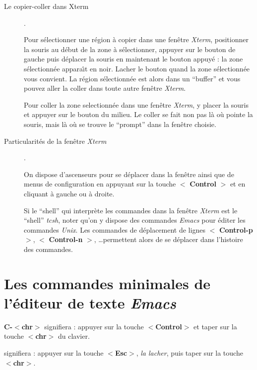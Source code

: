 \begin{description}
\item[Le copier-coller dans Xterm]. 

Pour s\'electionner une r\'egion 
\`a copier dans une fen\^ etre {\em Xterm}, 
 positionner la souris au d\'ebut de la zone \`a s\'electionner,
appuyer sur le bouton de gauche puis d\'eplacer la souris en maintenant le
bouton appuy\'e : la zone s\'electionn\'ee appara\^{\i}t en noir.
Lacher le bouton quand la zone s\'electionn\'ee vous convient. La
r\'egion s\'electionn\'ee est alors dans un ``buffer'' et vous pouvez
aller la coller dans toute autre fen\^etre {\em Xterm}.

\noindent Pour coller la zone selectionn\'ee dans une fen\^etre {\em Xterm}, 
y placer la souris et appuyer sur le bouton du milieu.
Le coller se fait non pas l\`a o\`u pointe la souris, mais l\`a
o\`u se trouve le ``prompt'' dans la fen\^etre choisie.

\item[Particularit\'es de la fen\^etre {\em Xterm}]. 

On dispose d'ascenseurs pour se d\'eplacer dans la fen\^etre ainsi que de 
menus de confi\-guration en appuyant sur la touche $<$ {\bf Control} $>$ et en cliquant \`a gauche ou \`a droite. 

Si le ``shell'' qui  interpr\`ete les commandes dans la fen\^etre {\em Xterm} 
est le ``shell'' {\em tcsh}, noter qu'on y dispose des commandes
 {\em Emacs} pour \'editer les commandes {\em Unix}. 
Les commandes de d\'eplacement de lignes
$<$ {\bf Control-p} $>$, $<$ {\bf Control-n} $>$, \ldots permettent alors de 
se d\'eplacer dans l'histoire des commandes.
\end{description}

\newpage

\section{Les commandes minimales de l'\'editeur de texte {\em Emacs}}

{\bf C-$<$chr$>$} signifiera : appuyer sur la touche
 $<${\bf Control}$>$ et taper sur  la touche $<${\bf chr}$>$ du clavier. 

 signifiera : appuyer sur la touche $<${\bf Esc}$>$,
{\em la lacher}, puis taper sur la touche $<${\bf chr}$>$.
\medskip

